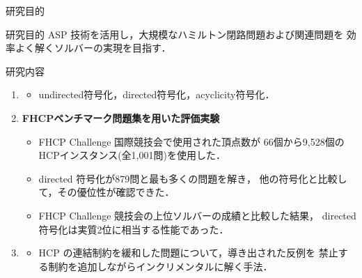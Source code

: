 \documentclass[dvipdfmx]{beamer}
\begin{document}
\begin{frame}{研究目的}
  \begin{alertblock}{研究目的}
    ASP 技術を活用し，大規模なハミルトン閉路問題および関連問題を
    効率よく解くソルバーの実現を目指す．
  \end{alertblock}
  \pause
  \begin{block}{研究内容}
   \begin{enumerate}
    \item {}
	  \begin{itemize}
	   \item \textsf{undirected}符号化，\textsf{directed}符号化，\textsf{acyclicity}符号化．
	  \end{itemize}
	  \pause
    \item \alert{\bf FHCPベンチマーク問題集を用いた評価実験}
	  \begin{itemize}
	   \item \alert{FHCP Challenge 国際競技会}で使用された頂点数が
		 66個から9,528個の HCPインスタンス(全1,001問)を使用した．
	   \item directed 符号化が879問と最も多くの問題を解き，
		 他の符号化と比較して，その優位性が確認できた．
	   \item FHCP Challenge 競技会の上位ソルバーの成績と比較した結果，
		 directed 符号化は\alert{実質2位}に相当する性能であった．
	  \end{itemize}
	  \pause
    \item {}
	  \begin{itemize}
	   \item HCP の連結制約を緩和した問題について，導き出された反例を
		 禁止する制約を追加しながらインクリメンタルに解く手法．
	  \end{itemize}
   \end{enumerate}
  \end{block}
\end{frame}
\end{document}
